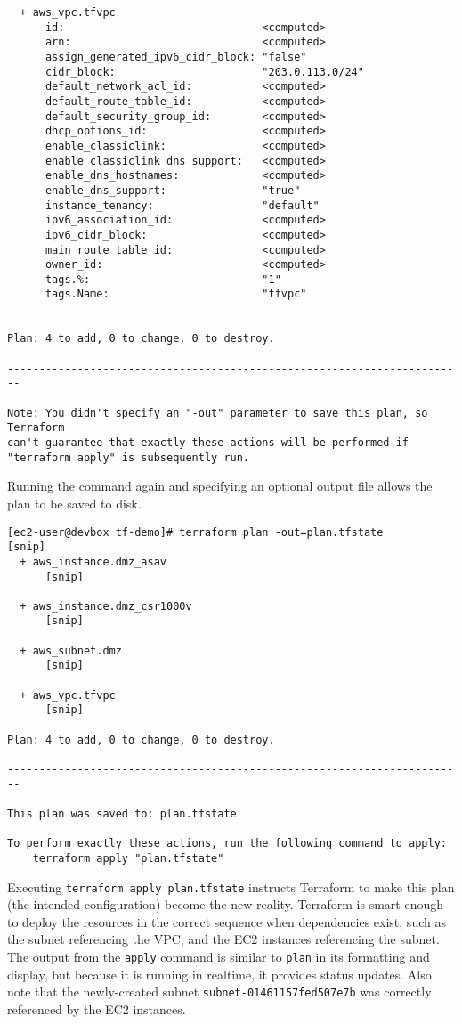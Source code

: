 \begin{verbatim}
  + aws_vpc.tfvpc
      id:                               <computed>
      arn:                              <computed>
      assign_generated_ipv6_cidr_block: "false"
      cidr_block:                       "203.0.113.0/24"
      default_network_acl_id:           <computed>
      default_route_table_id:           <computed>
      default_security_group_id:        <computed>
      dhcp_options_id:                  <computed>
      enable_classiclink:               <computed>
      enable_classiclink_dns_support:   <computed>
      enable_dns_hostnames:             <computed>
      enable_dns_support:               "true"
      instance_tenancy:                 "default"
      ipv6_association_id:              <computed>
      ipv6_cidr_block:                  <computed>
      main_route_table_id:              <computed>
      owner_id:                         <computed>
      tags.%:                           "1"
      tags.Name:                        "tfvpc"


Plan: 4 to add, 0 to change, 0 to destroy.

------------------------------------------------------------------------

Note: You didn't specify an "-out" parameter to save this plan, so Terraform
can't guarantee that exactly these actions will be performed if
"terraform apply" is subsequently run.
\end{verbatim}

Running the command again and specifying an optional output file allows the
plan to be saved to disk.

\begin{verbatim}
[ec2-user@devbox tf-demo]# terraform plan -out=plan.tfstate
[snip]
  + aws_instance.dmz_asav
      [snip]

  + aws_instance.dmz_csr1000v
      [snip]

  + aws_subnet.dmz
      [snip]

  + aws_vpc.tfvpc
      [snip]

Plan: 4 to add, 0 to change, 0 to destroy.

------------------------------------------------------------------------

This plan was saved to: plan.tfstate

To perform exactly these actions, run the following command to apply:
    terraform apply "plan.tfstate"
\end{verbatim}

Executing \verb|terraform apply plan.tfstate| instructs Terraform to make this plan
(the intended configuration) become the new reality. Terraform is smart enough
to deploy the resources in the correct sequence when dependencies exist, such
as the subnet referencing the VPC, and the EC2 instances referencing the
subnet. The output from the \verb|apply| command is similar to \verb|plan| in its
formatting and display, but because it is running in realtime, it provides
status updates. Also note that the newly-created subnet
\verb|subnet-01461157fed507e7b| was correctly referenced by the EC2 instances.

